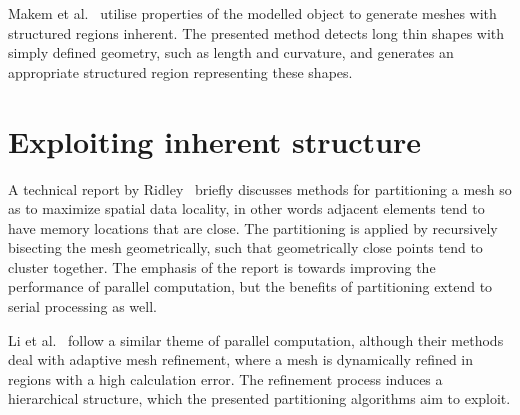 Makem et al.~\cite{makem2012automatic} utilise properties of the modelled object to generate meshes with structured regions inherent. The presented method detects long thin shapes with simply defined geometry, such as length and curvature, and generates an appropriate structured region representing these shapes.



\section{Exploiting inherent structure}


A technical report by Ridley~\cite{ridley2010guide} briefly discusses methods for partitioning a mesh so as to maximize spatial data locality, in other words adjacent elements tend to have memory locations that are close. The partitioning is applied by recursively bisecting the mesh geometrically, such that geometrically close points tend to cluster together. The emphasis of the report is towards improving the performance of parallel computation, but the benefits of partitioning extend to serial processing as well.




Li et al.~\cite{li2004hierarchical} follow a similar theme of parallel computation, although their methods deal with adaptive mesh refinement, where a mesh is dynamically refined in regions with a high calculation error. The refinement process induces a hierarchical structure, which the presented partitioning algorithms aim to exploit.



